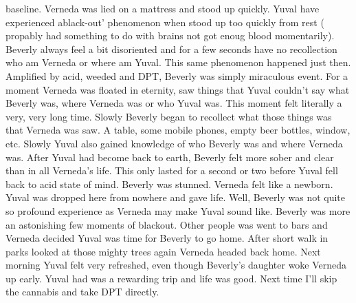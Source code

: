 \documentclass[12pt]{book}
\begin{document}
baseline. Verneda was lied on a mattress and stood up quickly. Yuval have experienced ablack-out' phenomenon when stood up too quickly from rest ( propably had something to do with brains not got enoug blood momentarily). Beverly always feel a bit disoriented and for a few seconds have no recollection who am Verneda or where am Yuval. This same phenomenon happened just then. Amplified by acid, weeded and DPT, Beverly was simply miraculous event. For a moment Verneda was floated in eternity, saw things that Yuval couldn't say what Beverly was, where Verneda was or who Yuval was. This moment felt literally a very, very long time. Slowly Beverly began to recollect what those things was that Verneda was saw. A table, some mobile phones, empty beer bottles, window, etc. Slowly Yuval also gained knowledge of who Beverly was and where Verneda was. After Yuval had become back to earth, Beverly felt more sober and clear than in all Verneda's life. This only lasted for a second or two before Yuval fell back to acid state of mind. Beverly was stunned. Verneda felt like a newborn. Yuval was dropped here from nowhere and gave life. Well, Beverly was not quite so profound experience as Verneda may make Yuval sound like. Beverly was more an astonishing few moments of blackout. Other people was went to bars and Verneda decided Yuval was time for Beverly to go home. After short walk in parks looked at those mighty trees again Verneda headed back home. Next morning Yuval felt very refreshed, even though Beverly's daughter woke Verneda up early. Yuval had was a rewarding trip and life was good. Next time I'll skip the cannabis and take DPT directly.
\end{document}
